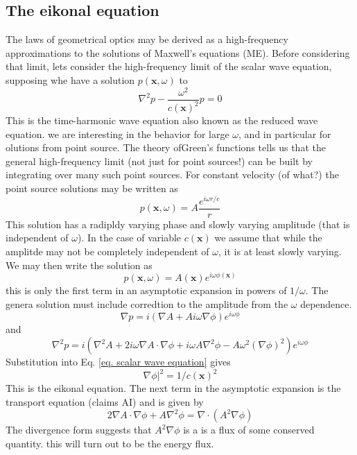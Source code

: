 \documentclass[../../main.tex]{subfiles} %
\begin{document}
\subsection{The eikonal equation}
The laws of geometrical optics may be derived as a high-frequency approximations to the solutions of Maxwell's equations (ME). Before considering that limit, lets consider the high-frequency limit of the scalar wave equation, supposing whe have a solution $p(\mathbf{x},\omega)$ to
\begin{equation}\label{eq. scalar wave equation}
    \nabla^2p-\frac{\omega^2}{c(\mathbf{x})^2}p=0
\end{equation}
This is the time-harmonic wave equation also known as the reduced wave equation. we are interesting in the behavior for large $\omega$, and in particular for olutions from  point source. The theory ofGreen's functions tells us that the general high-frequency limit (not just for point sources!) can be built by integrating over many such point sources. For constant velocity (of what?) the point source solutions may be written as
\begin{equation}
    p(\mathbf{x},\omega)=A\frac{e^{i\omega r/c}}{r}
\end{equation}
This solution has a radipldy varying phase and slowly varying amplitude (that is independent of $\omega$). In the case of variable $c(\mathbf{x})$ we assume that while the amplitde may not be completely independent of $\omega$, it is at least slowly varying. We may then write the solution as
\begin{equation}
    p(\mathbf{x},\omega)=A(\mathbf{x})e^{i\omega \phi(\mathbf{x})}
\end{equation}
this is only the first term in an asymptotic expansion in powers of $1/\omega$. The genera solution must include corredtion to the amplitude from the $\omega$ dependence.
\begin{equation}
    \nabla p=i\left(\nabla A+A i\omega \nabla\phi\right)e^{i\omega\phi}
\end{equation}
and 
\begin{equation}
    \nabla^2 p = i\left(\nabla^2 A+2i\omega\nabla A\cdot\nabla\phi+i\omega A\nabla^2\phi-A\omega^2(\nabla\phi)^2\right)e^{i\omega\phi}
\end{equation}
Substitution into Eq. \ref{eq. scalar wave equation} gives
\begin{equation}\label{eq. eikonal equation}
    \nabla\phi|^2=1/c(\mathbf{x})^2
\end{equation}
This is the eikonal equation. The next term in the asymptotic expansion is the transport equation (claims AI) and is given by
\begin{equation}
    2\nabla A\cdot\nabla\phi+A\nabla^2\phi=\nabla\cdot(A^2\nabla\phi)
\end{equation}
The divergence form suggests that $A^2\nabla\phi$ is a is a flux of some conserved quantity. this will turn out to be the energy flux. 
\end{document}
